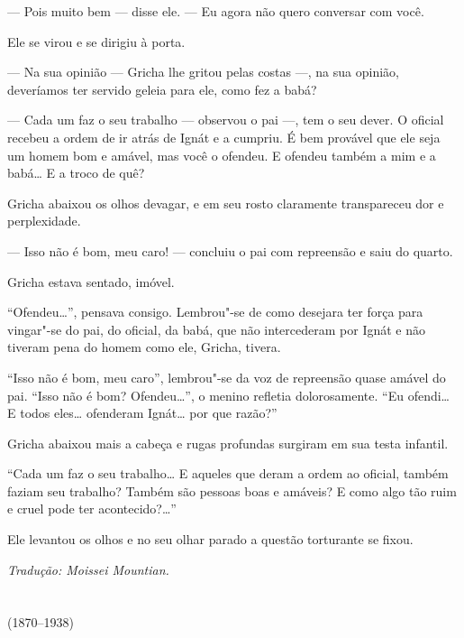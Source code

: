 --- Pois muito bem --- disse ele. --- Eu agora não quero conversar com
você.

Ele se virou e se dirigiu à porta.

--- Na sua opinião --- Gricha lhe gritou pelas costas ---, na sua
opinião, deveríamos ter servido geleia para ele, como fez a babá?

--- Cada um faz o seu trabalho --- observou o pai ---, tem o seu dever.
O oficial recebeu a ordem de ir atrás de Ignát e a cumpriu. É bem
provável que ele seja um homem bom e amável, mas você o ofendeu. E
ofendeu também a mim e a babá\ldots{} E a troco de quê?

Gricha abaixou os olhos devagar, e em seu rosto claramente transpareceu
dor e perplexidade.

--- Isso não é bom, meu caro! --- concluiu o pai com repreensão e saiu
do quarto.

Gricha estava sentado, imóvel.

``Ofendeu\ldots{}'', pensava consigo. Lembrou"-se de como desejara ter força
para vingar"-se do pai, do oficial, da babá, que não intercederam por
Ignát e não tiveram pena do homem como ele, Gricha, tivera.

``Isso não é bom, meu caro'', lembrou"-se da voz de repreensão quase
amável do pai. ``Isso não é bom? Ofendeu\ldots{}'', o menino refletia
dolorosamente. ``Eu ofendi\ldots{} E todos eles\ldots{} ofenderam Ignát\ldots{} por que
razão?''

Gricha abaixou mais a cabeça e rugas profundas surgiram em sua testa
infantil.

``Cada um faz o seu trabalho\ldots{} E aqueles que deram a ordem ao oficial,
também faziam seu trabalho? Também são pessoas boas e amáveis? E como
algo tão ruim e cruel pode ter acontecido?\ldots{}''

Ele levantou os olhos e no seu olhar parado a questão torturante se
fixou.

\medskip

{\footnotesize\hfill\emph{Tradução: Moissei Mountian.}}


\chapter*{}
\label{part10}
\thispagestyle{empty}

\begin{vplace}[1.5]
{\HUGES\hfill{}}

{\LARGE\hfill\textlt(1870–1938)}
\end{vplace}


